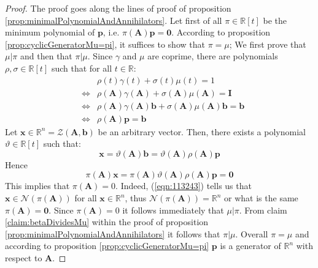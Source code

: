 \documentclass[a4paper,10pt,oneside]{book}
\begin{document}
\begin{proof}
 The proof goes along the lines of proof of proposition \ref{prop:minimalPolynomialAndAnnihilators}. Let first of all $\pi\in\mathbb{R}[t]$ be the minimum polynomial of $\mathbf{p}$, i.e. $\pi(\mathbf{A})\mathbf{p}=\mathbf{0}$. According to proposition \ref{prop:cyclicGeneratorMu=pi}, it suffices to show that $\pi=\mu$; We first prove that $\mu|\pi$ and then that $\pi|\mu$. Since $\gamma$ and $\mu$ are coprime, there are polynomials $\rho,\sigma\in\mathbb{R}[t]$ such that for all $t\in\mathbb{R}$:
 \begin{eqnarray}
  &&\rho(t)\gamma(t)+\sigma(t)\mu(t) = 1  \\
  &\Leftrightarrow&\rho(\mathbf{A})\gamma(\mathbf{A})+\sigma(\mathbf{A})\mu(\mathbf{A}) = \mathbf{I}  \\
&\Leftrightarrow&\rho(\mathbf{A})\gamma(\mathbf{A})\mathbf{b}+\sigma(\mathbf{A})\mu(\mathbf{A})\mathbf{b} = \mathbf{b}  \\
&\Leftrightarrow&\rho(\mathbf{A})\mathbf{p} = \mathbf{b} 
 \end{eqnarray}
Let $\mathbf{x}\in\mathbb{R}^n=\mathcal{Z}(\mathbf{A},\mathbf{b})$ be an arbitrary vector. Then, there exists a polynomial $\vartheta\in\mathbb{R}[t]$ such that:
\begin{equation}
 \mathbf{x}=\vartheta(\mathbf{A})\mathbf{b}=\vartheta(\mathbf{A})\rho(\mathbf{A})\mathbf{p}
\end{equation}
Hence
\begin{equation}\label{eqn:113243}
 \pi(\mathbf{A})\mathbf{x}=\pi(\mathbf{A})\vartheta(\mathbf{A})\rho(\mathbf{A})\mathbf{p}=\mathbf{0}
\end{equation}
This implies that $\pi(\mathbf{A})=0$. Indeed, (\ref{eqn:113243}) tells us that $\mathbf{x}\in\mathcal{N}(\pi(\mathbf{A}))$ for all $\mathbf{x}\in\mathbb{R}^n$, thus $\mathcal{N}(\pi(\mathbf{A}))=\mathbb{R}^n$ or what is the same $\pi(\mathbf{A})=\mathbf{0}$. Since $\pi(\mathbf{A})=0$ it follows immediately that $\mu|\pi$. From claim \ref{claim:betaDividesMu} within the proof of proposition \ref{prop:minimalPolynomialAndAnnihilators} it follows that $\pi|\mu$. Overall $\pi=\mu$ and according to proposition \ref{prop:cyclicGeneratorMu=pi} $\mathbf{p}$ is a generator of $\mathbb{R}^n$ with respect to $\mathbf{A}$.
\end{proof}
\end{document}
